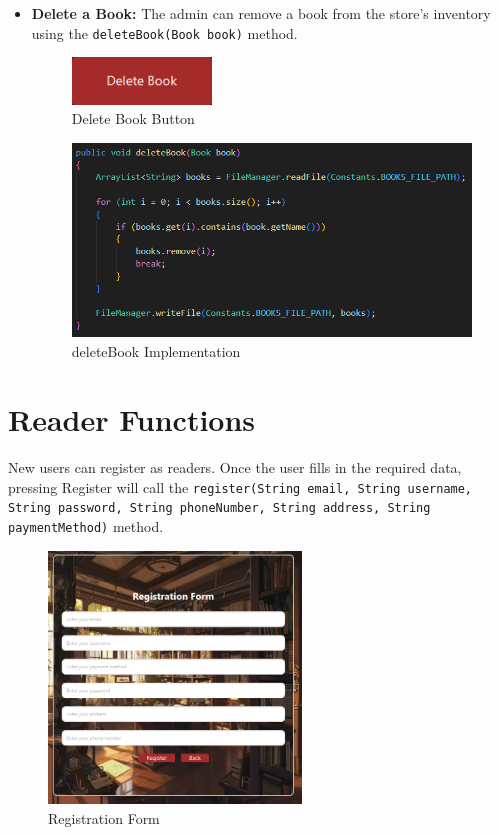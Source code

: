\documentclass[a4paper,14pt]{extarticle}
\begin{document}
\begin{itemize}
    \item \textbf{Delete a Book:} The admin can remove a book from the store's inventory using the \texttt{delete\-Book(Book book)} method.
    \begin{figure}[H]
        \centering
        \includegraphics[width=0.35\textwidth]{Media/Delete Book.png}
        \caption{Delete Book Button}
    \end{figure}
    \begin{figure}[H]
        \centering
        \includegraphics[width=\textwidth]{Media/deleteBook.png}
        \caption{deleteBook Implementation}
    \end{figure}
\end{itemize}

\newpage
\section*{Reader Functions}
New users can register as readers. Once the user fills in the required data, pressing Register will call the 
\texttt{register(String email, String username, String password, String phone\-Number, String address, String payment\-Method)} method.
\begin{figure}[H]
    \centering
    \includegraphics[width=0.6\textwidth]{Media/Register Form.png}
    \caption{Registration Form}
\end{figure}
\end{document}
